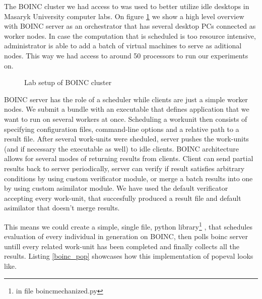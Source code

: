 \documentclass[12pt,oneside]{fithesis2}
\begin{document}
The BOINC cluster we had access to was used to better utilize idle desktops in Masaryk University computer labs. On figure \ref{boinc1} we show a high level overview with BOINC server as an orchestrator that has several desktop PCs connected as worker nodes. In case the computation that is scheduled is too resource intensive, administrator is able to add a batch of virtual machines to serve as aditional nodes. This way we had access to around 50 processors to run our experiments on.

\begin{figure}[htb!]
\caption{Lab setup of BOINC cluster}
\label{boinc1}
\centering
{}
\end{figure}

BOINC server has the role of a scheduler while clients are just a simple worker nodes. We submit a bundle with an executable that defines application that we want to run on several workers at once. Scheduling a workunit then consists of specifying configuration files, command-line options and a relative path to a result file. After several work-units were sheduled, server pushes the work-units (and if necessary the executable as well) to idle clients. BOINC architecture allows for several modes of returning results from clients. Client can send partial results back to server periodically, server can verify if result satisfies arbitrary conditions by using custom verificator module, or merge a batch results into one by using custom asimilator module. We have used the default verificator accepting every work-unit, that succesfully produced a result file and default asimilator that doesn't merge results.

This means we could create a simple, single file, python library\footnote{in file boincmechanized.py} \cite{tarball}, that schedules evaluation of every individual in generation on BOINC, then polls boinc server untill every related work-unit has been completed and finally collects all the results. Listing \ref{boinc_pop} showcases how this implementation of popeval looks like.
\end{document}
